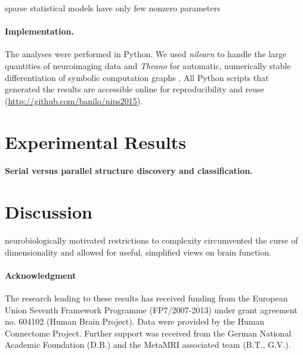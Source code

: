 \documentclass{article} %
\begin{document}
sparse statistical models have only few nonzero parameters












\paragraph{Implementation.}
The analyses were performed in Python.
We used \textit{nilearn} to handle
the large quantities of neuroimaging data 
\cite{abrah14}
and
\textit{Theano} for automatic, numerically stable
differentiation of symbolic computation graphs
\cite{bastien2012theano, bergstra2010theano}.
All Python scripts that generated the results are
accessible online for reproducibility and reuse
(\url{http://github.com/banilo/nips2015}).



\section{Experimental Results}
\paragraph{Serial versus parallel structure discovery and classification.}



\section{Discussion}

neurobiologically motivated restrictions to complexity circumvented the curse of dimensionality and allowed for useful, simplified views on brain function.






\paragraph{Acknowledgment}
{\small The research leading to these results has received funding from the
European Union Seventh Framework Programme (FP7/2007-2013)
under grant agreement no. 604102 (Human Brain Project).
Data were provided by the Human Connectome Project.
Further support was received from
the German National Academic Foundation (D.B.)
and the MetaMRI associated team (B.T., G.V.).
}

\small


\end{document}
